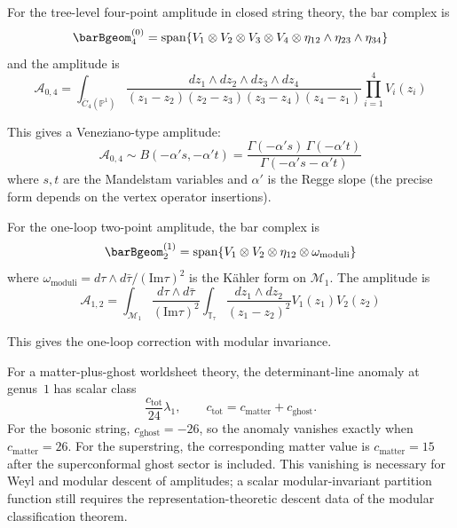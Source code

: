 \begin{example}
For the tree-level four-point amplitude in closed string theory, the bar complex is
\[\barBgeom^{(0)}_4 = \text{span}\{V_1 \otimes V_2 \otimes V_3 \otimes V_4 \otimes \eta_{12} \wedge \eta_{23} \wedge \eta_{34}\}\]
and the amplitude is
\[\mathcal{A}_{0,4} = \int_{\overline{C}_4(\mathbb{P}^1)} \frac{dz_1 \wedge dz_2 \wedge dz_3 \wedge dz_4}{(z_1-z_2)(z_2-z_3)(z_3-z_4)(z_4-z_1)} \prod_{i=1}^4 V_i(z_i)\]

This gives a Veneziano-type amplitude:
\[\mathcal{A}_{0,4} \sim B(-\alpha' s, -\alpha' t) = \frac{\Gamma(-\alpha' s)\,\Gamma(-\alpha' t)}{\Gamma(-\alpha' s - \alpha' t)}\]
where $s, t$ are the Mandelstam variables and $\alpha'$ is the Regge slope (the precise form depends on the vertex operator insertions).
\end{example}

\begin{example}
For the one-loop two-point amplitude, the bar complex is
\[\barBgeom^{(1)}_2 = \text{span}\{V_1 \otimes V_2 \otimes \eta_{12} \otimes \omega_{\text{moduli}}\}\]
where $\omega_{\text{moduli}} = d\tau \wedge d\bar{\tau}/(\text{Im}\tau)^2$ is the K\"ahler form on $\mathcal{M}_1$.
The amplitude is
\[\mathcal{A}_{1,2} = \int_{\mathcal{M}_1} \frac{d\tau \wedge d\bar{\tau}}{(\text{Im}\tau)^2} \int_{\mathbb{T}_\tau} \frac{dz_1 \wedge dz_2}{(z_1-z_2)^2} V_1(z_1) V_2(z_2)\]

This gives the one-loop correction with modular invariance.
\end{example}

\begin{theorem}\label{thm:modular-anomaly}
For a matter-plus-ghost worldsheet theory, the determinant-line
anomaly at genus~$1$ has scalar class
\[
\frac{c_{\mathrm{tot}}}{24}\lambda_1,
\qquad
c_{\mathrm{tot}}=c_{\mathrm{matter}}+c_{\mathrm{ghost}}.
\]
For the bosonic string, $c_{\mathrm{ghost}}=-26$, so the anomaly
vanishes exactly when $c_{\mathrm{matter}}=26$. For the superstring,
the corresponding matter value is $c_{\mathrm{matter}}=15$ after the
superconformal ghost sector is included. This vanishing is necessary
for Weyl and modular descent of amplitudes; a scalar modular-invariant
partition function still requires the representation-theoretic descent
data of the modular classification theorem.
\end{theorem}

